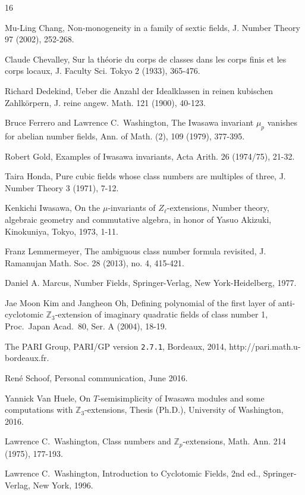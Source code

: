 \documentclass{amsart}
\begin{document}
\begin{thebibliography}{16}

Mu-Ling Chang,  Non-monogeneity in a family of sextic fields, J. Number Theory 97 (2002), 252-268.

Claude Chevalley, Sur la th\'eorie du corps de classes dans les
corps finis et les corps locaux, J. Faculty Sci. Tokyo
2 (1933), 365-476.

Richard Dedekind, Ueber die Anzahl der Idealklassen in reinen kubischen Zahlk\"orpern, J. reine angew. Math. 121 (1900), 40-123.

Bruce Ferrero and Lawrence C.\ Washington, The Iwasawa invariant $\mu_{p}$ vanishes for abelian number
   fields, Ann. of Math. (2), 109 (1979), 377-395.

Robert Gold, Examples of Iwasawa invariants, Acta Arith. 26 (1974/75), 21-32.
 
 Taira Honda, Pure cubic fields whose class numbers are multiples of three, J. Number Theory 3 (1971), 7-12.

 Kenkichi Iwasawa, On the $\mu$-invariants of $Z_{\ell}$-extensions,
   Number theory, algebraic geometry and commutative algebra, in
      honor of Yasuo Akizuki, Kinokuniya, Tokyo, 1973, 1-11.
 
 Franz Lemmermeyer, The ambiguous class number formula revisited,
J. Ramanujan  Math. Soc. 28 (2013), no. 4, 415-421.

Daniel A. Marcus, Number Fields, Springer-Verlag, New York-Heidelberg, 1977.

 Jae Moon Kim and Jangheon Oh, Defining polynomial of the first layer of anti-cyclotomic $\mathbb Z_3$-extension
of imaginary quadratic fields of class number 1, Proc.\ Japan Acad.\ 80, Ser. A (2004), 18-19.

 The PARI Group, PARI/GP version {\tt 2.7.1}, Bordeaux, 2014, {http://pari.math.u-bordeaux.fr}.


Ren\'e Schoof, Personal communication, June 2016.

Yannick Van Huele, On $T$-semisimplicity of
Iwasawa modules and some computations with $\mathbb Z_3$-extensions, Thesis (Ph.D.), University of Washington, 2016.


 Lawrence C.\ Washington, Class numbers and $\mathbb Z_p$-extensions, Math. Ann. 214 (1975), 177-193.

Lawrence C.\ Washington, Introduction to Cyclotomic Fields, 2nd ed., Springer-Verlag, New York, 1996.
\end{thebibliography}
\end{document}
